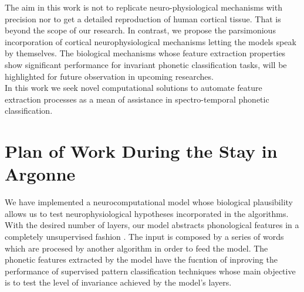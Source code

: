 \documentclass[11pt,a4paper]{article}
\begin{document}
The aim in this work is not to replicate 
neuro-physiological mechanisms with precision nor to get a detailed reproduction
of human cortical tissue. That is beyond the scope of our research. 
In contrast, we propose the parsimonious incorporation of cortical
neurophysiological mechanisms letting the models
speak by themselves.
The biological mechanisms whose feature extraction
properties show significant performance
for invariant phonetic classification tasks, will be
highlighted for future observation in upcoming researches. \\

In this work we seek novel computational solutions
to automate feature extraction processes as a mean
of assistance in spectro-temporal phonetic classification. \\




















\section{Plan of Work During the Stay in Argonne}

We have implemented a neurocomputational model whose biological plausibility
allows us to test neurophysiological hypotheses incorporated in the algorithms.
With the desired number of layers, our model abstracts phonological features
in a completely unsupervised fashion .
The input is composed by a series of words which are procesed by another algorithm
in order to feed  the model.
The phonetic features extracted by the model have the fucntion of inproving
the performance of supervised pattern classification techniques
whose main objective is to test the level of invariance achieved by the model's layers. \\
\end{document}
